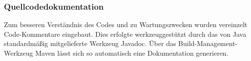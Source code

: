 \subsubsection{Quellcodedokumentation}
\label{sec:Quellcodedokumentation}
Zum besseren Verständnis des Codes und zu Wartungszwecken wurden vereinzelt Code-Kom\-men\-tare eingebaut. Dies erfolgte werkzeuggestützt durch das von Java standardmäßig mitgelieferte Werkzeug Javadoc. Über das Build-Management-Werkzeug Maven lässt sich so automatisch eine Dokumentation generieren.


\newpage